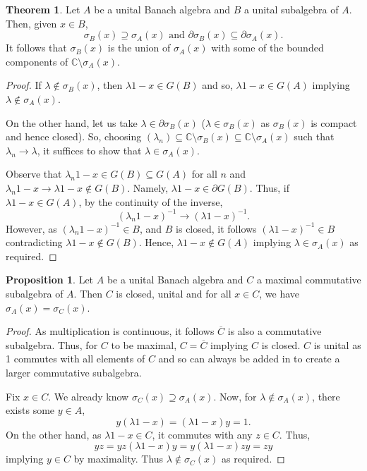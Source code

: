 \documentclass[]{article}
\theoremstyle{definition}
\newtheorem{theorem}{Theorem}
\newtheorem{proposition}{Proposition}[section]
\begin{document}
\begin{theorem}
  Let \(A\) be a unital Banach algebra and \(B\) a unital subalgebra of \(A\). Then, given \(x \in B\), 
  \[\sigma_B(x) \supseteq \sigma_A(x) \text{ and } \partial \sigma_B(x) \subseteq \partial \sigma_A(x).\]
  It follows that \(\sigma_B(x)\) is the union of \(\sigma_A(x)\) with some of the bounded components 
  of \(\mathbb{C} \setminus \sigma_A(x)\).
\end{theorem}
\begin{proof}
  If \(\lambda \not\in \sigma_B(x)\), then \(\lambda 1 - x \in G(B)\) and so, \(\lambda 1 - x \in G(A)\) 
  implying \(\lambda \not\in \sigma_A(x)\). 

  On the other hand, let us take \(\lambda \in \partial \sigma_B(x)\) (\(\lambda \in \sigma_B(x)\) as 
  \(\sigma_B(x)\) is compact and hence closed). So, choosing 
  \((\lambda_n) \subseteq \mathbb{C} \setminus \sigma_B(x) \subseteq \mathbb{C} \setminus \sigma_A(x)\) such that \(\lambda_n \to \lambda\), 
  it suffices to show that \(\lambda \in \sigma_A(x)\).

  Observe that \(\lambda_n 1 - x \in G(B) \subseteq G(A)\) for all \(n\) and 
  \(\lambda_n 1 - x \to \lambda 1 - x \not\in G(B)\). Namely, \(\lambda 1 - x \in \partial G(B)\). 
  Thus, if \(\lambda 1 - x \in G(A)\), by the continuity of the inverse, 
  \[(\lambda_n 1 - x)^{-1} \to (\lambda 1 - x)^{-1}.\]
  However, as \((\lambda_n 1 - x)^{-1} \in B\), and \(B\) is closed, it follows \((\lambda 1 - x)^{-1} \in B\) 
  contradicting \(\lambda 1 - x \not\in G(B)\). Hence, \(\lambda 1 - x \not\in G(A)\) implying 
  \(\lambda \in \sigma_A(x)\) as required. 
\end{proof}

\begin{proposition}
  Let \(A\) be a unital Banach algebra and \(C\) a maximal commutative subalgebra of \(A\). Then \(C\)
  is closed, unital and for all \(x \in C\), we have \(\sigma_A(x) = \sigma_C(x)\).  
\end{proposition}
\begin{proof}
  As multiplication is continuous, it follows \(\overline{C}\) is also a commutative subalgebra. Thus, 
  for \(C\) to be maximal, \(C = \overline{C}\) implying \(C\) is closed. \(C\) is unital as 1 commutes 
  with all elements of \(C\) and so can always be added in to create a larger commutative subalgebra.

  Fix \(x \in C\). We already know \(\sigma_C(x) \supseteq \sigma_A(x)\). Now, for \(\lambda \not\in \sigma_A(x)\), 
  there exists some \(y \in A\), 
  \[y(\lambda 1 - x) = (\lambda 1 - x)y = 1.\]
  On the other hand, as \(\lambda 1 - x \in C\), it commutes with any \(z \in C\). Thus, 
  \[yz = yz(\lambda 1 - x)y = y(\lambda 1 - x)zy = zy\]
  implying \(y \in C\) by maximality. Thus \(\lambda \not\in \sigma_C(x)\) as required.
\end{proof}
\end{document}
